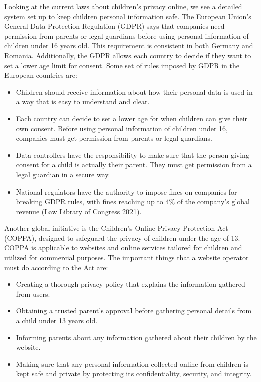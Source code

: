 \documentclass[a4paper, 10 pt, conference]{ieeeconf}  %
\begin{document}
Looking at the current laws about children’s privacy online, we see a detailed system set up to keep children personal information safe.
The European Union’s General Data Protection Regulation (GDPR) says that companies need permission from parents or legal guardians before using personal information of children under 16 years old. This requirement is consistent in both Germany and Romania. Additionally, the GDPR allows each country to decide if they want to set a lower age limit for consent. Some set of rules imposed by GDPR in the European countries are:
\begin{itemize}
    \item Children should receive information about how their personal data is used in a way that is easy to understand and clear.
    \item Each country can decide to set a lower age for when children can give their own consent. Before using personal information of children under 16, companies must get permission from parents or legal guardians.
    \item Data controllers have the responsibility to make sure that the person giving consent for a child is actually their parent. They must get permission from a legal guardian in a secure way.
    \item National regulators have the authority to impose fines on companies for breaking GDPR rules, with fines reaching up to 4\% of the company's global revenue (Law Library of Congress 2021).
\end{itemize}
Another global initiative is the Children’s Online Privacy Protection Act (COPPA), designed to safeguard the privacy of children under the age of 13. COPPA is applicable to websites and online services tailored for children and utilized for commercial purposes. The important things that a website operator must do according to the Act are:
\begin{itemize}
    \item Creating a thorough privacy policy that explains the information gathered from users.
    \item Obtaining a trusted parent's approval before gathering personal details from a child under 13 years old.
    \item Informing parents about any information gathered about their children by the website.
    \item Making sure that any personal information collected online from children is kept safe and private by protecting its confidentiality, security, and integrity.
\end{itemize}
\end{document}

